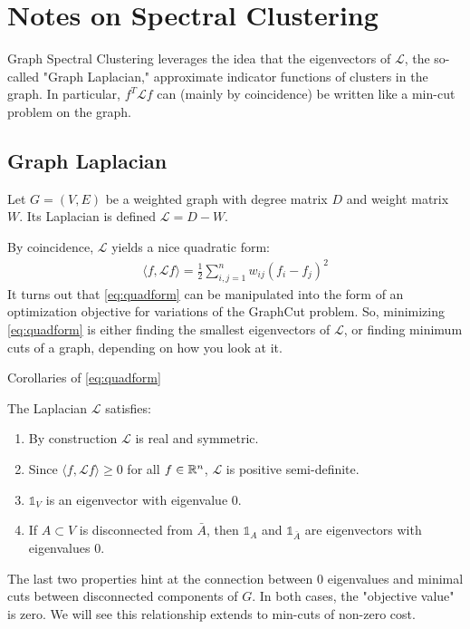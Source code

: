 \documentclass{article}
\begin{document}
\section{Notes on Spectral Clustering}
\nocite{von_luxburg2007spectral}

Graph Spectral Clustering leverages the idea that the eigenvectors of $\mathcal{L}$, the so-called "Graph Laplacian," approximate indicator functions of clusters in the graph. In particular, $f^T \mathcal{L} f$ can (mainly by coincidence) be written like a min-cut problem on the graph.

\subsection{Graph Laplacian}
\begin{dfn}
Let $G = (V, E)$ be a weighted graph with degree matrix $D$ and weight matrix $W$. Its Laplacian is defined $\mathcal{L} = D - W$.
\end{dfn}
By coincidence, $\mathcal{L}$ yields a nice quadratic form:
\begin{align} \label{eq:quadform}
    \langle f, \mathcal{L} f \rangle = \frac{1}{2} \sum_{i, j = 1}^n w_{ij}(f_i - f_j)^2
\end{align}
It turns out that \eqref{eq:quadform} can be manipulated into the form of an optimization objective for variations of the GraphCut problem. So, minimizing \eqref{eq:quadform} is either finding the smallest eigenvectors of $\mathcal{L}$, or finding minimum cuts of a graph, depending on how you look at it.

\begin{theorem}{Corollaries of \eqref{eq:quadform}} 

The Laplacian $\mathcal{L}$ satisfies:

\begin{enumerate}
    \item By construction $\mathcal{L}$ is real and symmetric.
    \item Since $\langle f, \mathcal{L} f \rangle \geq 0$ for all $f \in {\mathbb R}^n$, $\mathcal{L}$ is positive semi-definite.
    \item $\mathds{1}_V$ is an eigenvector with eigenvalue $0$. 
    \item If $A \subset V$ is disconnected from $\bar{A}$, then $\mathds{1}_A$ and $\mathds{1}_{\bar{A}}$ are eigenvectors with eigenvalues $0$. 
\end{enumerate}
\end{theorem}
\begin{rem}
The last two properties hint at the connection between $0$ eigenvalues and minimal cuts between disconnected components of $G$. In both cases, the "objective value" is zero. We will see this relationship extends to min-cuts of non-zero cost.
\end{rem}
\end{document}
